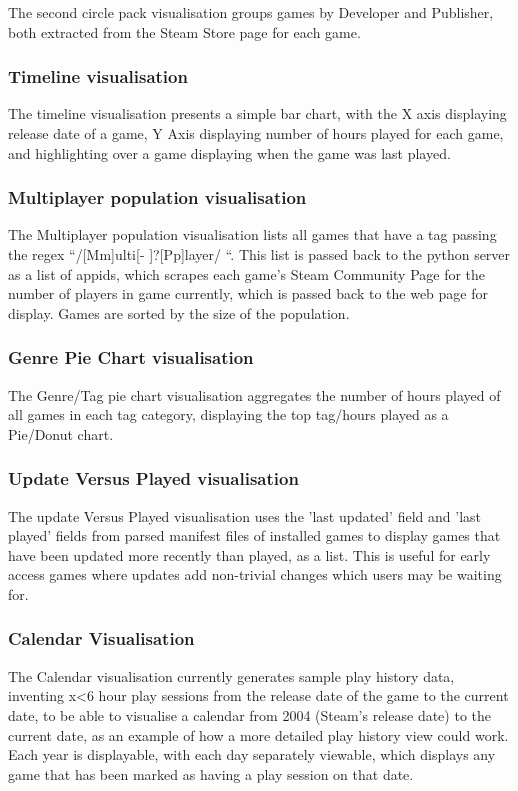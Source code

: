 \documentclass[11pt]{article}
\begin{document}
The second circle pack visualisation groups games by Developer and Publisher, both extracted from the Steam Store page for each game.

\subsubsection*{Timeline visualisation}
The timeline visualisation presents a simple bar chart, with the X axis displaying release date of a game, Y Axis displaying number of hours played for each game, and highlighting over a game displaying when the game was last played.

\subsubsection*{Multiplayer population visualisation}
The Multiplayer population visualisation lists all games that have a tag passing the regex ``/[Mm]ulti[- ]?[Pp]layer/ ``. This list is passed back to the python server as a list of appids, which scrapes each game's Steam Community Page for the number of players in game currently, which is passed back to the web page for display. Games are sorted by the size of the population.

\subsubsection*{Genre Pie Chart visualisation}
The Genre/Tag pie chart visualisation aggregates the number of hours played of all games in each tag category, displaying the top tag/hours played as a Pie/Donut chart.

\subsubsection*{Update Versus Played visualisation}
The update Versus Played visualisation uses the 'last updated' field and 'last played' fields from parsed manifest files of installed games to display games that have been updated more recently than played, as a list. This is useful for early access games where updates add non-trivial changes which users may be waiting for.

\subsubsection*{Calendar Visualisation}
The Calendar visualisation currently generates sample play history data, inventing x<6 hour play sessions from the release date of the game to the current date, to be able to visualise a calendar from 2004 (Steam's release date) to the current date, as an example of how a more detailed play history view could work. Each year is displayable, with each day separately viewable, which displays any game that has been marked as having a play session on that date.
\end{document}
